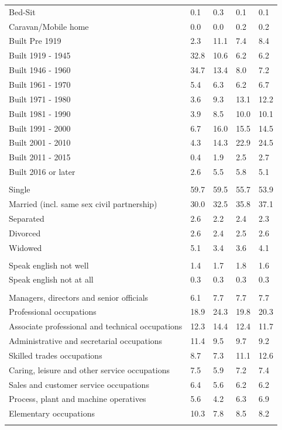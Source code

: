 \documentclass{article}
\begin{document}
\begin{table}[h]
\begin{tabular}{KTTTT}
Bed-Sit & 0.1& 0.3& 0.1& 0.1\\
Caravan/Mobile home & 0.0& 0.0& 0.2& 0.2\\
    \hline
Built Pre 1919 &  2.3& 11.1&  7.4&  8.4\\
Built 1919 - 1945 & 32.8& 10.6&  6.2&  6.2\\
Built  1946 - 1960 & 34.7& 13.4&  8.0&  7.2\\
Built  1961 - 1970 & 5.4& 6.3& 6.2& 6.7\\
Built  1971 - 1980 &  3.6&  9.3& 13.1& 12.2\\
Built  1981 - 1990 &  3.9&  8.5& 10.0& 10.1\\
Built  1991 - 2000 &  6.7& 16.0& 15.5& 14.5\\
Built  2001 - 2010 &  4.3& 14.3& 22.9& 24.5\\
Built  2011 - 2015 & 0.4& 1.9& 2.5& 2.7\\
Built  2016 or later & 2.6& 5.5& 5.8& 5.1\\
\hline
    \\
    \hline
Single & 59.7& 59.5& 55.7& 53.9\\
Married (incl. same sex civil partnership) & 30.0& 32.5& 35.8& 37.1\\
Separated  & 2.6& 2.2& 2.4& 2.3\\
Divorced  & 2.6& 2.4& 2.5& 2.6\\
Widowed & 5.1& 3.4& 3.6& 4.1\\
\hline
    \\ 
    \hline
Speak english not well & 1.4& 1.7& 1.8& 1.6\\
Speak english not at all & 0.3& 0.3& 0.3& 0.3\\
\hline
    \\
    \hline
Managers, directors and senior officials & 6.1& 7.7& 7.7& 7.7\\
Professional occupations & 18.9& 24.3& 19.8& 20.3\\
Associate professional and technical occupations & 12.3& 14.4& 12.4& 11.7\\
Administrative and secretarial occupations & 11.4&  9.5&  9.7&  9.2\\
Skilled trades occupations &  8.7&  7.3& 11.1& 12.6\\
Caring, leisure and other service occupations & 7.5& 5.9& 7.2& 7.4\\
Sales and customer service occupations & 6.4& 5.6& 6.2& 6.2\\
Process, plant and machine operatives & 5.6& 4.2& 6.3& 6.9\\
Elementary occupations & 10.3&  7.8&  8.5&  8.2\\
\hline
\end{tabular}
\end{table}
\end{document}
